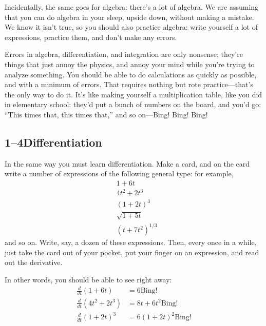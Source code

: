 \documentclass[11pt,oneside]{article}
\providecommand{\ddt}[2]{\frac{d#1}{d#2}}
\begin{document}
Incidentally, the same goes for algebra: there's a lot of algebra. We are assuming that you can do algebra in your sleep, upside down, without making a mistake. We know it isn't true, so you should also practice algebra: write yourself a lot of expressions, practice them, and don't make any errors.\par

Errors in algebra, differentiation, and integration are only nonsense; they're things that just annoy the physics, and annoy your mind while you're trying to analyze something. You should be able to do calculations as quickly as possible, and with a minimum of errors. That requires nothing but rote practice---that's the only way to do it. It's like making yourself a multiplication table, like you did in elementary school: they'd put a bunch of numbers on the board, and you'd go: ``This times that, this times that,'' and so on---Bing! Bing! Bing!\par

\subsection*{1--4Differentiation}

In the same way you must learn differentiation. Make a card, and on the card write a number of expressions of the following general type: for example, 
\begin{equation*} \begin{aligned} &1+6t\\[.5ex] &4t^2+2t^3\\[.5ex] &(1+2t)^3\\[.5ex] &\sqrt{1+5t}\\[.5ex] &(t+7t^2)^{1/3} \end{aligned} \tag{1.1}
\label{Eq:TIPS:1:1} \end{equation*}
 and so on. Write, say, a dozen of these expressions. Then, every once in a while, just take the card out of your pocket, put your finger on an expression, and read out the derivative.\par

In other words, you should be able to see right away: 
\begin{equation*} \begin{aligned} \ddt{}{t}(1+6t) &= 6 \mathrm{ Bing!}\\[1ex] \ddt{}{t}(4t^2+2t^3) &= 8t+6t^2 \mathrm{ Bing!}\\[1ex] \ddt{}{t}(1+2t)^3 &= 6(1+2t)^2 \mathrm{ Bing!} \end{aligned} \tag{1.2}
\label{Eq:TIPS:1:2} \end{equation*}
\par
\end{document}
